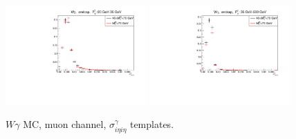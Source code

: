 \begin{figure}[htb]
\begin{center}
  \includegraphics[width=0.48\textwidth]{../figs/figs_v11/MUON_WGamma/QuickChecks/cTemplatesVsWMt_Wg_phoSigmaIEtaIEta_ENDCAP_pt20to35.pdf} \includegraphics[width=0.48\textwidth]{../figs/figs_v11/MUON_WGamma/QuickChecks/cTemplatesVsWMt_Wg_phoSigmaIEtaIEta_ENDCAP_pt35to500.pdf}\\
  \caption{$W\gamma$ MC, muon channel, $\sigma_{i \eta i \eta}^\gamma$ templates.}
  \label{fig:templatesVsWMt_Wg_SIHIH}
  \end{center}
\end{figure}

